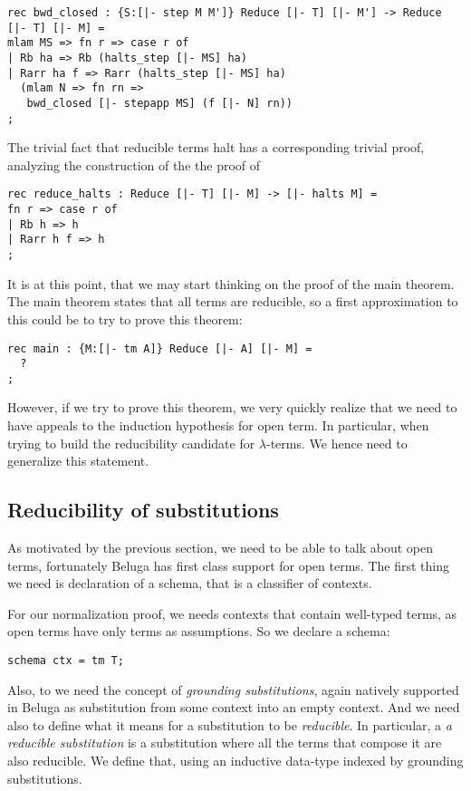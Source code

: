 \begin{lstlisting}
rec bwd_closed : {S:[|- step M M']} Reduce [|- T] [|- M'] -> Reduce [|- T] [|- M] =
mlam MS => fn r => case r of
| Rb ha => Rb (halts_step [|- MS] ha)
| Rarr ha f => Rarr (halts_step [|- MS] ha)
  (mlam N => fn rn =>
   bwd_closed [|- stepapp MS] (f [|- N] rn))
;
\end{lstlisting}

The trivial fact that reducible terms halt has a corresponding
trivial proof, analyzing the construction of the the proof of

\begin{lstlisting}
rec reduce_halts : Reduce [|- T] [|- M] -> [|- halts M] =
fn r => case r of
| Rb h => h
| Rarr h f => h
;
\end{lstlisting}

It is at this point, that we may start thinking on the proof of the
main theorem. The main theorem states that all terms are reducible, so
a first approximation to this could be to try to prove this theorem:

\begin{lstlisting}
rec main : {M:[|- tm A]} Reduce [|- A] [|- M] =
  ?
;
\end{lstlisting}

However, if we try to prove this theorem, we very quickly realize that
we need to have appeals to the induction hypothesis for open term. In
particular, when trying to build the reducibility candidate for
$\lambda$-terms. We hence need to generalize this statement.

\subsection{Reducibility of substitutions}

As motivated by the previous section, we need to be able to talk about
open terms, fortunately Beluga has first class support for open
terms. The first thing we need is declaration of a schema, that is a
classifier of contexts.

For our normalization proof, we needs contexts that contain well-typed
terms, as open terms have only terms as assumptions. So we declare a schema:
\begin{lstlisting}
schema ctx = tm T;
\end{lstlisting}

Also, to  we need the concept of \emph{grounding substitutions}, again
natively supported in Beluga as substitution from some context into an
empty context. And we need also to define what it means for a
substitution to be \emph{reducible}. In particular, a \emph{a
  reducible substitution} is a substitution where all the terms that
compose it are also reducible. We define that, using an inductive
data-type indexed by grounding substitutions.

